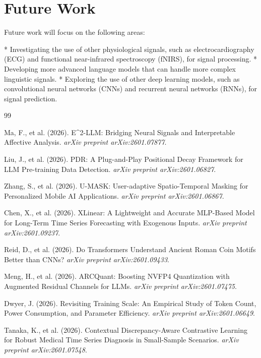 \documentclass{article}
\begin{document}
\section{Future Work}

Future work will focus on the following areas:

* Investigating the use of other physiological signals, such as electrocardiography (ECG) and functional near-infrared spectroscopy (fNIRS), for signal processing.
* Developing more advanced language models that can handle more complex linguistic signals.
* Exploring the use of other deep learning models, such as convolutional neural networks (CNNs) and recurrent neural networks (RNNs), for signal prediction.

\begin{thebibliography}{99}

 Ma, F., et al. (2026). E^2-LLM: Bridging Neural Signals and Interpretable Affective Analysis. \emph{arXiv preprint arXiv:2601.07877}.

 Liu, J., et al. (2026). PDR: A Plug-and-Play Positional Decay Framework for LLM Pre-training Data Detection. \emph{arXiv preprint arXiv:2601.06827}.

 Zhang, S., et al. (2026). U-MASK: User-adaptive Spatio-Temporal Masking for Personalized Mobile AI Applications. \emph{arXiv preprint arXiv:2601.06867}.

 Chen, X., et al. (2026). XLinear: A Lightweight and Accurate MLP-Based Model for Long-Term Time Series Forecasting with Exogenous Inputs. \emph{arXiv preprint arXiv:2601.09237}.

 Reid, D., et al. (2026). Do Transformers Understand Ancient Roman Coin Motifs Better than CNNs? \emph{arXiv preprint arXiv:2601.09433}.

 Meng, H., et al. (2026). ARCQuant: Boosting NVFP4 Quantization with Augmented Residual Channels for LLMs. \emph{arXiv preprint arXiv:2601.07475}.

 Dwyer, J. (2026). Revisiting Training Scale: An Empirical Study of Token Count, Power Consumption, and Parameter Efficiency. \emph{arXiv preprint arXiv:2601.06649}.

 Tanaka, K., et al. (2026). Contextual Discrepancy-Aware Contrastive Learning for Robust Medical Time Series Diagnosis in Small-Sample Scenarios. \emph{arXiv preprint arXiv:2601.07548}.


\end{thebibliography}
\end{document}
